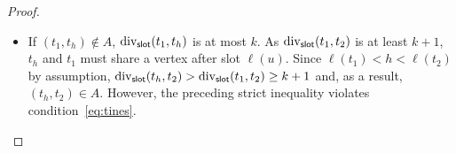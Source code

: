 \begin{proof}
\begin{itemize}
      \item If $(t_1, t_h) \not \in A$, 
      $\mathrm{div}_{\mathsf{slot}}(t_1, t_h)$ is at most $k$.
      As $\mathrm{div}_{\mathsf{slot}}(t_1, t_2)$ is at least $k + 1$, 
      $t_h$ and $t_1$ must share a vertex after slot $\ell(u)$. 
      Since $\ell(t_1) < h < \ell(t_2)$ by assumption, 
      $\mathrm{div}_{\mathsf{slot}}(t_h, t_2) > \mathrm{div}_{\mathsf{slot}}(t_1, t_2) \geq k + 1$ 
      and, as a result, $(t_h, t_2) \in A$. 
      However, the preceding strict inequality violates condition~\eqref{eq:tines}. 
    \end{itemize}
    
    






\end{proof}
